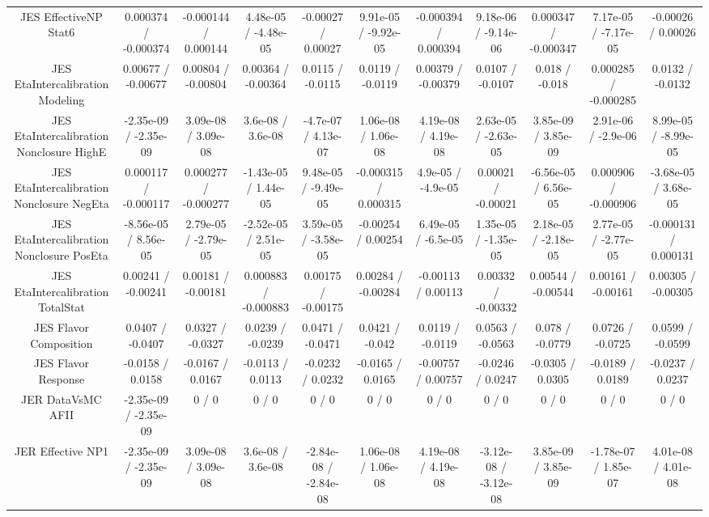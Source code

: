 \begin{table}[htbp]
\begin{center}
\begin{tabular}{|c|c|c|c|c|c|c|c|c|c|c|}
  JES EffectiveNP Stat6 & 0.000374 / -0.000374 & -0.000144 / 0.000144 & 4.48e-05 / -4.48e-05 & -0.00027 / 0.00027 & 9.91e-05 / -9.92e-05 & -0.000394 / 0.000394 & 9.18e-06 / -9.14e-06 & 0.000347 / -0.000347 & 7.17e-05 / -7.17e-05 & -0.00026 / 0.00026 \\ 
  JES EtaIntercalibration Modeling & 0.00677 / -0.00677 & 0.00804 / -0.00804 & 0.00364 / -0.00364 & 0.0115 / -0.0115 & 0.0119 / -0.0119 & 0.00379 / -0.00379 & 0.0107 / -0.0107 & 0.018 / -0.018 & 0.000285 / -0.000285 & 0.0132 / -0.0132 \\ 
  JES EtaIntercalibration Nonclosure HighE & -2.35e-09 / -2.35e-09 & 3.09e-08 / 3.09e-08 & 3.6e-08 / 3.6e-08 & -4.7e-07 / 4.13e-07 & 1.06e-08 / 1.06e-08 & 4.19e-08 / 4.19e-08 & 2.63e-05 / -2.63e-05 & 3.85e-09 / 3.85e-09 & 2.91e-06 / -2.9e-06 & 8.99e-05 / -8.99e-05 \\ 
  JES EtaIntercalibration Nonclosure NegEta & 0.000117 / -0.000117 & 0.000277 / -0.000277 & -1.43e-05 / 1.44e-05 & 9.48e-05 / -9.49e-05 & -0.000315 / 0.000315 & 4.9e-05 / -4.9e-05 & 0.00021 / -0.00021 & -6.56e-05 / 6.56e-05 & 0.000906 / -0.000906 & -3.68e-05 / 3.68e-05 \\ 
  JES EtaIntercalibration Nonclosure PosEta & -8.56e-05 / 8.56e-05 & 2.79e-05 / -2.79e-05 & -2.52e-05 / 2.51e-05 & 3.59e-05 / -3.58e-05 & -0.00254 / 0.00254 & 6.49e-05 / -6.5e-05 & 1.35e-05 / -1.35e-05 & 2.18e-05 / -2.18e-05 & 2.77e-05 / -2.77e-05 & -0.000131 / 0.000131 \\ 
  JES EtaIntercalibration TotalStat & 0.00241 / -0.00241 & 0.00181 / -0.00181 & 0.000883 / -0.000883 & 0.00175 / -0.00175 & 0.00284 / -0.00284 & -0.00113 / 0.00113 & 0.00332 / -0.00332 & 0.00544 / -0.00544 & 0.00161 / -0.00161 & 0.00305 / -0.00305 \\ 
  JES Flavor Composition & 0.0407 / -0.0407 & 0.0327 / -0.0327 & 0.0239 / -0.0239 & 0.0471 / -0.0471 & 0.0421 / -0.042 & 0.0119 / -0.0119 & 0.0563 / -0.0563 & 0.078 / -0.0779 & 0.0726 / -0.0725 & 0.0599 / -0.0599 \\ 
  JES Flavor Response & -0.0158 / 0.0158 & -0.0167 / 0.0167 & -0.0113 / 0.0113 & -0.0232 / 0.0232 & -0.0165 / 0.0165 & -0.00757 / 0.00757 & -0.0246 / 0.0247 & -0.0305 / 0.0305 & -0.0189 / 0.0189 & -0.0237 / 0.0237 \\ 
  JER DataVsMC AFII & -2.35e-09 / -2.35e-09 & 0 / 0 & 0 / 0 & 0 / 0 & 0 / 0 & 0 / 0 & 0 / 0 & 0 / 0 & 0 / 0 & 0 / 0 \\ 
  JER Effective NP1 & -2.35e-09 / -2.35e-09 & 3.09e-08 / 3.09e-08 & 3.6e-08 / 3.6e-08 & -2.84e-08 / -2.84e-08 & 1.06e-08 / 1.06e-08 & 4.19e-08 / 4.19e-08 & -3.12e-08 / -3.12e-08 & 3.85e-09 / 3.85e-09 & -1.78e-07 / 1.85e-07 & 4.01e-08 / 4.01e-08 \\ 

\end{tabular}
\end{center}
\end{table}

